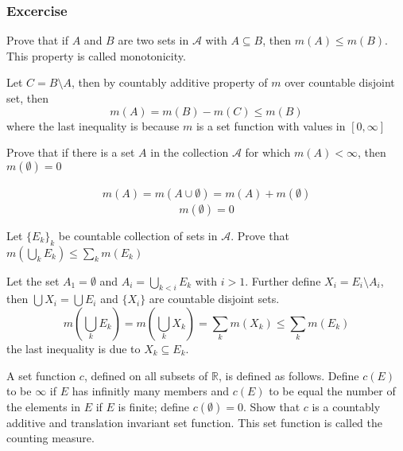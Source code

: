 \subsubsection{Excercise}

\begin{exercise}{1}
    Prove that if $A$ and $B$ are two sets in $\mathcal A$ with $A \subseteq B$, then $m(A) \leq m(B)$. This property is called monotonicity.
\end{exercise}
\begin{solution}
Let $C = B \setminus A$, then by countably additive property of $m$ over countable disjoint set, then
\[m(A) = m(B) - m(C) \leq m(B)\]
where the last inequality is because $m$ is a set function with values in $[0, \infty]$
\end{solution} 
 
\begin{exercise}{2} 
Prove that if there is a set $A$ in the collection $\mathcal A$ for which $m(A) < \infty$, then $m(\emptyset)= 0$
\end{exercise}

\begin{solution}
    \begin{align*}
        m(A) = m(A \cup \emptyset) = m(A) + m(\emptyset)
    \end{align*}
    \begin{equation*}
        m(\emptyset) = 0
    \end{equation*}
\end{solution}

\begin{exercise}{3}
Let $\{E_k\}_k$ be countable collection of sets in $\mathcal A$. Prove that $m(\bigcup_k E_k) \leq \sum_k m(E_k)$
\end{exercise}

\begin{solution}
    Let the set $A_1 = \emptyset$ and $A_i = \bigcup_{k < i} E_k$ with $i > 1$. Further define $X_i = E_i \setminus A_i $, then 
    $\bigcup X_i = \bigcup E_i$ and $\{X_i\}$ are countable disjoint sets. 
    \begin{equation*}
        m(\bigcup_k E_k) = m(\bigcup_k X_k) = \sum_k m(X_k) \leq \sum_k m(E_k)
    \end{equation*}
    the last inequality is due to $X_k \subseteq E_k$.
\end{solution}

\begin{exercise}{4}
    A set function $c$, defined on all subsets of $\mathbb R$, is defined as follows. Define $c(E)$ to be $\infty$ if $E$ has infinitly many members and $c(E)$ to be equal the number of the elements in $E$ if $E$ is finite; define $c(\emptyset) = 0$. Show that $c$ is a countably additive and translation invariant set function. This set function is called the counting measure.
\end{exercise}

